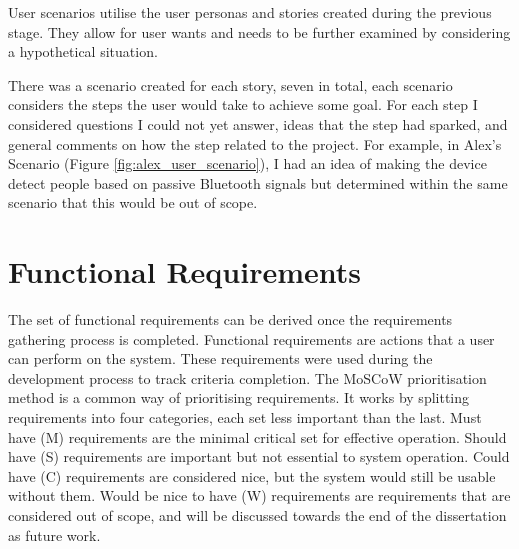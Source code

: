 \documentclass{l4proj}
\begin{document}
User scenarios utilise the user personas and stories created during the previous stage. They allow for user wants and needs to be further examined by considering a hypothetical situation.

There was a scenario created for each story, seven in total, each scenario considers the steps the user would take to achieve some goal. For each step I considered questions I could not yet answer, ideas that the step had sparked, and general comments on how the step related to the project. For example, in Alex's Scenario (Figure \ref{fig:alex_user_scenario}), I had an idea of making the device detect people based on passive Bluetooth signals but determined within the same scenario that this would be out of scope.

\section{Functional Requirements} \label{sec:func_requirements}

The set of functional requirements can be derived once the requirements gathering process is completed. Functional requirements are actions that a user can perform on the system. These requirements were used during the development process to track criteria completion. The MoSCoW prioritisation method \citep{hudaib_requirements_2018} is a common way of prioritising requirements. It works by splitting requirements into four categories, each set less important than the last. Must have (M) requirements are the minimal critical set for effective operation. Should have (S) requirements are important but not essential to system operation. Could have (C) requirements are considered nice, but the system would still be usable without them. Would be nice to have (W) requirements are requirements that are considered out of scope, and will be discussed towards the end of the dissertation as future work.
\end{document}
